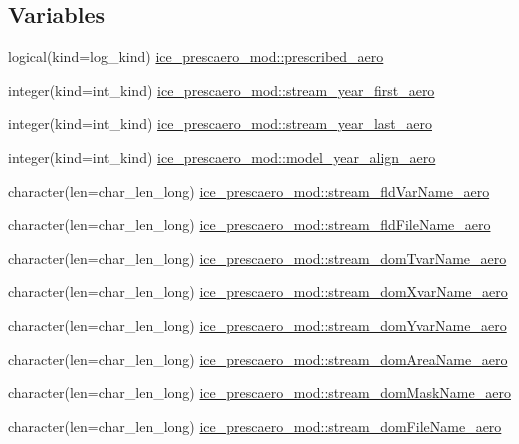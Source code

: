 \subsection*{Variables}
\begin{DoxyCompactItemize}
\item 
logical(kind=log\_\-kind) \hyperlink{namespaceice__prescaero__mod_a12fbaeed0ee95a72e9c96406be9d7578}{ice\_\-prescaero\_\-mod::prescribed\_\-aero}
\item 
integer(kind=int\_\-kind) \hyperlink{namespaceice__prescaero__mod_a707a18c373ea6a3f7aa42d9a1872f322}{ice\_\-prescaero\_\-mod::stream\_\-year\_\-first\_\-aero}
\item 
integer(kind=int\_\-kind) \hyperlink{namespaceice__prescaero__mod_ae0ffc599bd1d380d44541bac8026fc8d}{ice\_\-prescaero\_\-mod::stream\_\-year\_\-last\_\-aero}
\item 
integer(kind=int\_\-kind) \hyperlink{namespaceice__prescaero__mod_a992cda048d40587ac16120bfa8691a42}{ice\_\-prescaero\_\-mod::model\_\-year\_\-align\_\-aero}
\item 
character(len=char\_\-len\_\-long) \hyperlink{namespaceice__prescaero__mod_a92f0e6afee8f0fce04d39a9b726579c4}{ice\_\-prescaero\_\-mod::stream\_\-fldVarName\_\-aero}
\item 
character(len=char\_\-len\_\-long) \hyperlink{namespaceice__prescaero__mod_a5528b5428fb89c7e220fc959f2c80009}{ice\_\-prescaero\_\-mod::stream\_\-fldFileName\_\-aero}
\item 
character(len=char\_\-len\_\-long) \hyperlink{namespaceice__prescaero__mod_a73733a5cec61434d5a1da1d83629e601}{ice\_\-prescaero\_\-mod::stream\_\-domTvarName\_\-aero}
\item 
character(len=char\_\-len\_\-long) \hyperlink{namespaceice__prescaero__mod_a6ba0f1529c78ceec4eb50dd637ee5a54}{ice\_\-prescaero\_\-mod::stream\_\-domXvarName\_\-aero}
\item 
character(len=char\_\-len\_\-long) \hyperlink{namespaceice__prescaero__mod_a9e4fb440c2ad241c5a3d034e180fffef}{ice\_\-prescaero\_\-mod::stream\_\-domYvarName\_\-aero}
\item 
character(len=char\_\-len\_\-long) \hyperlink{namespaceice__prescaero__mod_afc3d3f278ce9859e477534269596e82f}{ice\_\-prescaero\_\-mod::stream\_\-domAreaName\_\-aero}
\item 
character(len=char\_\-len\_\-long) \hyperlink{namespaceice__prescaero__mod_a9ba2c680142ab95e945ff4071df68330}{ice\_\-prescaero\_\-mod::stream\_\-domMaskName\_\-aero}
\item 
character(len=char\_\-len\_\-long) \hyperlink{namespaceice__prescaero__mod_a4b93709d4642b42b9af488601bef97f6}{ice\_\-prescaero\_\-mod::stream\_\-domFileName\_\-aero}

\end{DoxyCompactItemize}
